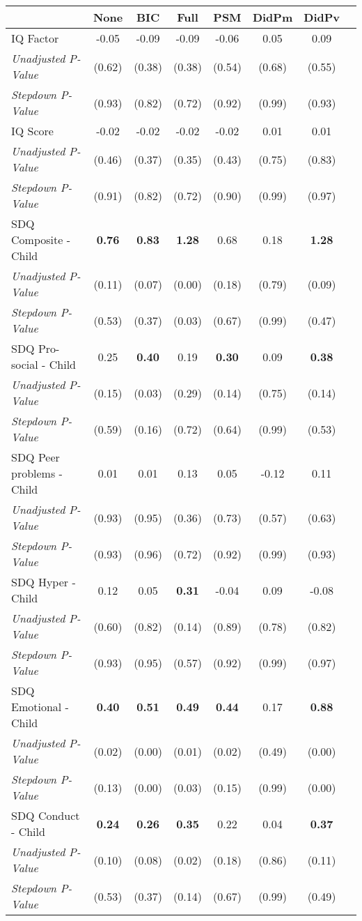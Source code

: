 \begin{tabular}{l c c c c c c c}
\toprule
 & None & BIC & Full & PSM & DidPm & DidPv \\
\midrule
IQ Factor & -0.05 & -0.09 & -0.09 & -0.06 & 0.05 & 0.09 \\
\quad \textit{Unadjusted P-Value} & (0.62) & (0.38) & (0.38) & (0.54) & (0.68) & (0.55) \\
\quad \textit{Stepdown P-Value} & (0.93) & (0.82) & (0.72) & (0.92) & (0.99) & (0.93) \\
IQ Score & -0.02 & -0.02 & -0.02 & -0.02 & 0.01 & 0.01 \\
\quad \textit{Unadjusted P-Value} & (0.46) & (0.37) & (0.35) & (0.43) & (0.75) & (0.83) \\
\quad \textit{Stepdown P-Value} & (0.91) & (0.82) & (0.72) & (0.90) & (0.99) & (0.97) \\
SDQ Composite - Child & \textbf{ 0.76 } & \textbf{ 0.83 } & \textbf{ 1.28 } & 0.68 & 0.18 & \textbf{ 1.28 } \\
\quad \textit{Unadjusted P-Value} & (0.11) & (0.07) & (0.00) & (0.18) & (0.79) & (0.09) \\
\quad \textit{Stepdown P-Value} & (0.53) & (0.37) & (0.03) & (0.67) & (0.99) & (0.47) \\
SDQ Pro-social - Child & 0.25 & \textbf{ 0.40 } & 0.19 & \textbf{ 0.30 } & 0.09 & \textbf{ 0.38 } \\
\quad \textit{Unadjusted P-Value} & (0.15) & (0.03) & (0.29) & (0.14) & (0.75) & (0.14) \\
\quad \textit{Stepdown P-Value} & (0.59) & (0.16) & (0.72) & (0.64) & (0.99) & (0.53) \\
SDQ Peer problems - Child & 0.01 & 0.01 & 0.13 & 0.05 & -0.12 & 0.11 \\
\quad \textit{Unadjusted P-Value} & (0.93) & (0.95) & (0.36) & (0.73) & (0.57) & (0.63) \\
\quad \textit{Stepdown P-Value} & (0.93) & (0.96) & (0.72) & (0.92) & (0.99) & (0.93) \\
SDQ Hyper - Child & 0.12 & 0.05 & \textbf{ 0.31 } & -0.04 & 0.09 & -0.08 \\
\quad \textit{Unadjusted P-Value} & (0.60) & (0.82) & (0.14) & (0.89) & (0.78) & (0.82) \\
\quad \textit{Stepdown P-Value} & (0.93) & (0.95) & (0.57) & (0.92) & (0.99) & (0.97) \\
SDQ Emotional - Child & \textbf{ 0.40 } & \textbf{ 0.51 } & \textbf{ 0.49 } & \textbf{ 0.44 } & 0.17 & \textbf{ 0.88 } \\
\quad \textit{Unadjusted P-Value} & (0.02) & (0.00) & (0.01) & (0.02) & (0.49) & (0.00) \\
\quad \textit{Stepdown P-Value} & (0.13) & (0.00) & (0.03) & (0.15) & (0.99) & (0.00) \\
SDQ Conduct - Child & \textbf{ 0.24 } & \textbf{ 0.26 } & \textbf{ 0.35 } & 0.22 & 0.04 & \textbf{ 0.37 } \\
\quad \textit{Unadjusted P-Value} & (0.10) & (0.08) & (0.02) & (0.18) & (0.86) & (0.11) \\
\quad \textit{Stepdown P-Value} & (0.53) & (0.37) & (0.14) & (0.67) & (0.99) & (0.49) \\
\bottomrule
\end{tabular}
